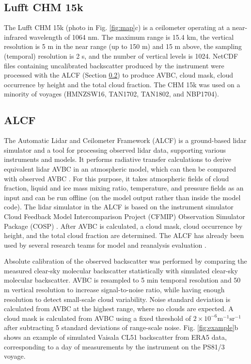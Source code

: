 \documentclass[12pt,a4paper]{article}
\begin{document}
\subsection{Lufft CHM 15k}
\label{sec:chm15k}

The Lufft CHM 15k (photo in Fig. \ref{fig:map}c) is a ceilometer operating at a
near-infrared wavelength of 1064 nm. The maximum range is 15.4 km, the vertical
resolution is 5 m in the near range (up to 150 m) and 15 m above, the sampling
(temporal) resolution is 2 s, and the number of vertical levels is 1024.
NetCDF files containing uncalibrated backscatter produced by the instrument
were processed with the ALCF (Section \ref{sec:alcf}) to produce AVBC, cloud
mask, cloud occurrence by height and the total cloud fraction. The CHM 15k was
used on a minority of voyages (HMNZSW16, TAN1702, TAN1802, and NBP1704).

\subsection{ALCF}
\label{sec:alcf}

The Automatic Lidar and Ceilometer Framework (ALCF) is a ground-based lidar
simulator and a tool for processing observed lidar data, supporting various
instruments and models. It performs radiative transfer calculations to derive
equivalent lidar AVBC in an atmospheric model, which can then be compared with
observed AVBC \citep{kuma2021}. For this purpose, it takes atmospheric fields
of cloud fraction, liquid and ice mass mixing ratio, temperature, and pressure
fields as an input and can be run offline (on the model output rather than
inside the model code). The lidar simulator in the ALCF is based on the
instrument simulator Cloud Feedback Model Intercomparison Project (CFMIP)
Observation Simulator Package (COSP) \citep{bodas-salcedo2011}.  After AVBC is
calculated, a cloud mask, cloud occurrence by height, and the total cloud
fraction are determined. The ALCF has already been used by several research
teams for model and reanalysis evaluation
\citep{kuma2020,kremser2021,guyot2022,pei2023,whitehead2023,mcdonald2024}.

Absolute calibration of the observed backscatter was performed by comparing the
measured clear-sky molecular backscatter statistically with simulated clear-sky
molecular backscatter. AVBC is resampled to 5 min temporal resolution and 50 m
vertical resolution to increase signal-to-noise ratio, while having enough
resolution to detect small-scale cloud variability. Noise standard deviation is
calculated from AVBC at the highest range, where no clouds are expected.  A
cloud mask is calculated from AVBC using a fixed threshold of $\mathrm{2\times
10^{-6} m^{-1}sr^{-1}}$ after subtracting 5 standard deviations of range-scale
noise. Fig. \ref{fig:example}b shows an example of simulated Vaisala CL51
backscatter from ERA5 data, corresponding to a day of measurements by the
instrument on the PS81/3 voyage.
\end{document}
